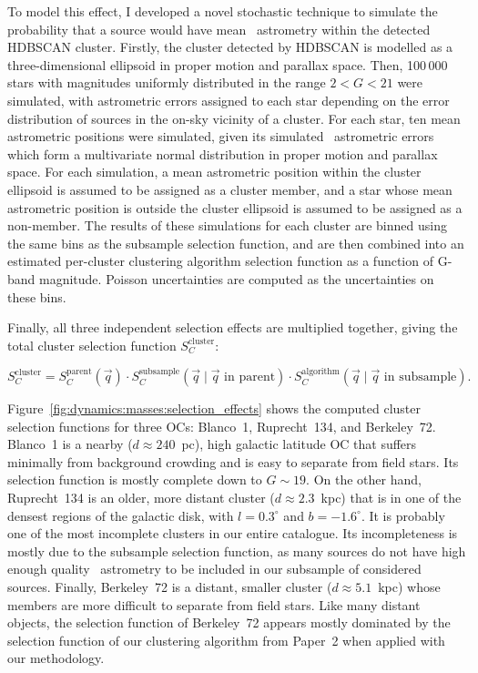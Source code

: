 To model this effect, I developed a novel stochastic technique to simulate the probability that a source would have mean \gaia\ astrometry within the detected HDBSCAN cluster. Firstly, the cluster detected by HDBSCAN is modelled as a three-dimensional ellipsoid in proper motion and parallax space. Then, 100\,000 stars with magnitudes uniformly distributed in the range $2 < G < 21$ were simulated, with astrometric errors assigned to each star depending on the error distribution of sources in the on-sky vicinity of a cluster. For each star, ten mean astrometric positions were simulated, given its simulated \gaia\ astrometric errors which form a multivariate normal distribution in proper motion and parallax space. For each simulation, a mean astrometric position within the cluster ellipsoid is assumed to be assigned as a cluster member, and a star whose mean astrometric position is outside the cluster ellipsoid is assumed to be assigned as a non-member. The results of these simulations for each cluster are binned using the same bins as the subsample selection function, and are then combined into an estimated per-cluster clustering algorithm selection function as a function of G-band magnitude. Poisson uncertainties are computed as the uncertainties on these bins.

Finally, all three independent selection effects are multiplied together, giving the total cluster selection function $S_C^\text{cluster}$:

\begin{equation}
    S_C^\text{cluster} = 
    S_C^\text{parent}(\vec{q})
    \cdot
    S_C^\text{subsample}(\vec{q} \mid \vec{q}\text{ in parent})
    \cdot
    S_C^\text{algorithm}(\vec{q} \mid \vec{q}\text{ in subsample}).
    \label{eqn:dynamics:masses:selection_function}
\end{equation}

Figure~\ref{fig:dynamics:masses:selection_effects} shows the computed cluster selection functions for three OCs: Blanco~1, Ruprecht~134, and Berkeley~72. Blanco~1 is a nearby ($d\approx240$~pc), high galactic latitude OC that suffers minimally from background crowding and is easy to separate from field stars. Its selection function is mostly complete down to $G\sim19$. On the other hand, Ruprecht~134 is an older, more distant cluster ($d\approx2.3$~kpc) that is in one of the densest regions of the galactic disk, with $l=0.3^\circ$ and $b=-1.6^\circ$. It is probably one of the most incomplete clusters in our entire catalogue. Its incompleteness is mostly due to the subsample selection function, as many sources do not have high enough quality \gaia\ astrometry to be included in our subsample of considered sources. Finally, Berkeley~72 is a distant, smaller cluster ($d\approx5.1$~kpc) whose members are more difficult to separate from field stars. Like many distant objects, the selection function of Berkeley~72 appears mostly dominated by the selection function of our clustering algorithm from Paper~2 when applied with our methodology. 

